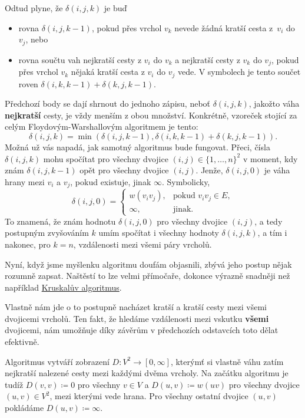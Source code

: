 Odtud plyne, že $\delta(i,j,k)$ je buď
\begin{itemize}
 \item rovna $\delta(i,j,k-1)$, pokud přes vrchol $v_k$ nevede žádná kratší
  cesta z~$v_i$ do $v_j$, nebo
 \item rovna součtu vah nejkratší cesty z $v_i$ do $v_k$ a nejkratší cesty z
  $v_k$ do $v_j$, pokud přes vrchol $v_k$ nějaká kratší cesta z $v_i$ do $v_j$
  vede. V symbolech je tento součet roven $\delta(i,k,k-1) + \delta(k,j,k-1)$.
\end{itemize}
Předchozí body se dají shrnout do jednoho zápisu, neboť $\delta(i,j,k)$, jakožto
váha \textbf{nejkratší} cesty, je vždy menším z obou množství. Konkrétně,
vzoreček stojící za celým Floydovým-Warshallovým algoritmem je tento:
\begin{equation*}
 \label{eq:delta-i-j-k}
 \tag{$\triangle$}
 \delta(i,j,k) = \min(\delta(i,j,k-1), \delta(i,k,k-1) + \delta(k,j,k-1)).
\end{equation*}
Možná už vás napadá, jak samotný algoritmus bude fungovat. Přeci, čísla
$\delta(i,j,k)$ mohu spočítat pro všechny dvojice $(i,j) \in \{1,\ldots,n\}^2$ v
moment, kdy znám $\delta(i,j,k-1)$ opět pro všechny dvojice $(i,j)$. Jenže,
$\delta(i,j,0)$ je váha hrany mezi $v_i$ a $v_j$, pokud existuje, jinak
$\infty$. Symbolicky,
\[
 \delta(i,j,0) =
 \begin{cases}
  w(v_iv_j), &\text{pokud } v_iv_j \in E,\\
  \infty, &\text{jinak}.
 \end{cases}
\]
To znamená, že znám hodnotu $\delta(i,j,0)$ pro všechny dvojice $(i,j)$, a tedy
postupným zvyšováním $k$ umím spočítat i všechny hodnoty $\delta(i,j,k)$, a tím
i nakonec, pro $k = n$, vzdálenosti mezi všemi páry vrcholů.

Nyní, když jsme myšlenku algoritmu doufám objasnili, zbývá jeho postup nějak
rozumně zapsat. Naštěstí to lze velmi přímočaře, dokonce výrazně snadněji než
například \hyperref[alg:kruskal]{Kruskalův algoritmus}.

Vlastně nám jde o to postupně nacházet kratší a kratší cesty mezi všemi
dvojicemi vrcholů. Ten fakt, že hledáme vzdálenosti mezi vskutku \textbf{všemi}
dvojicemi, nám umožňuje díky závěrům v předchozích odstavcích toto dělat
efektivně.

Algoritmus vytváří zobrazení $D: V^2 \to [0,\infty]$, kterýmť si vlastně
 váhu zatím nejkratší nalezené cesty mezi každými dvěma vrcholy.
Na začátku algoritmu je tudíž $D(v,v) \coloneqq 0$ pro všechny $v \in V$ a
$D(u,v) \coloneqq w(uv)$ pro všechny dvojice $(u,v) \in V^2$, mezi kterými vede
hrana. Pro všech\-ny ostatní dvojice $(u,v)$ pokládáme $D(u,v) \coloneqq
\infty$.

